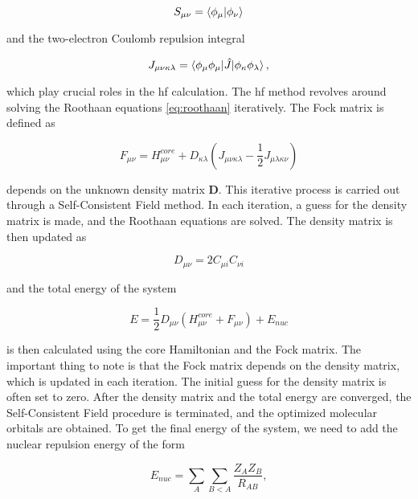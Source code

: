 \documentclass[open=any,parskip=half,11pt]{scrbook}
\begin{document}
\begin{equation}\label{eq:overlap}
S_{\mu\nu}=\braket{\phi_{\mu}|\phi_{\nu}}
\end{equation}

and the two-electron Coulomb repulsion integral

\begin{equation}\label{eq:coulomb}
J_{\mu\nu\kappa\lambda}=\braket{\phi_{\mu}\phi_{\mu}|\hat{J}|\phi_{\kappa}\phi_{\lambda}},
\end{equation}

which play crucial roles in the \acrshort{hf} calculation. The \acrshort{hf} method revolves around solving the Roothaan equations \ref{eq:roothaan} iteratively. The Fock matrix is defined as

\begin{equation}\label{eq:fock}
F_{\mu\nu}=H_{\mu\nu}^{core}+D_{\kappa\lambda}(J_{\mu\nu\kappa\lambda}-\frac{1}{2}J_{\mu\lambda\kappa\nu})
\end{equation}

depends on the unknown density matrix \(\mathbf{D}\). This iterative process is carried out through a Self-Consistent Field method. In each iteration, a guess for the density matrix is made, and the Roothaan equations are solved. The density matrix is then updated as

\begin{equation}
D_{\mu\nu}=2C_{\mu i}C_{\nu i}
\end{equation}

and the total energy of the system

\begin{equation}
E=\frac{1}{2}D_{\mu\nu}(H_{\mu\nu}^{core}+F_{\mu\nu})+E_{nuc}
\end{equation}

is then calculated using the core Hamiltonian and the Fock matrix. The important thing to note is that the Fock matrix depends on the density matrix, which is updated in each iteration. The initial guess for the density matrix is often set to zero. After the density matrix and the total energy are converged, the Self-Consistent Field procedure is terminated, and the optimized molecular orbitals are obtained. To get the final energy of the system, we need to add the nuclear repulsion energy of the form

\begin{equation}
E_{nuc}=\sum_{A}\sum_{B<A}\frac{Z_{A}Z_{B}}{R_{AB}},
\end{equation}
\end{document}
